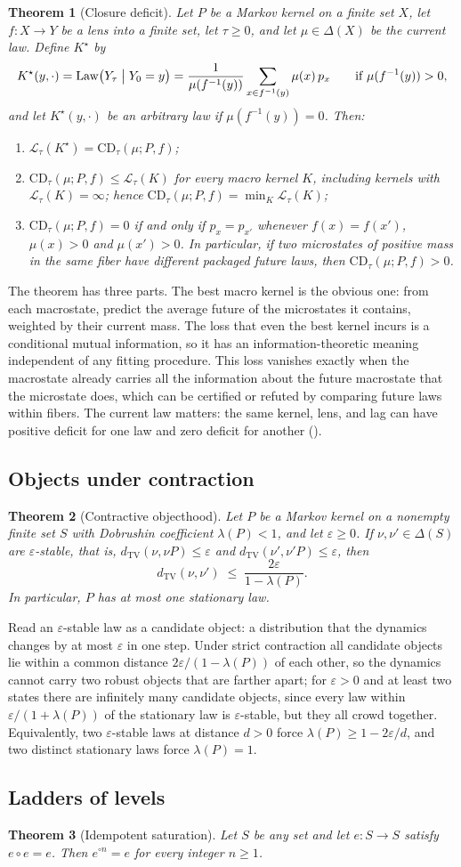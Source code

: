 \documentclass[11pt]{article}
\newtheorem{theorem}{Theorem}[section]
\theoremstyle{definition}
\newcommand{\1}{\mathbf{1}}
\newcommand{\dTV}{d_{\mathrm{TV}}}
\newcommand{\Law}{\mathrm{Law}}
\newcommand{\ThmStmtNGMACROCLOSUREDEFICIT}{Let $P$ be a Markov kernel on a finite set $X$, let $f:X\to Y$ be a lens into a finite set, let $\tau\ge 0$, and let $\mu\in\Delta(X)$ be the current law. Define $K^\star$ by
\[
  K^\star(y,\cdot)=\Law\bigl(Y_\tau\bigm| Y_0=y\bigr)=\frac{1}{\mu(f^{-1}(y))}\sum_{x\in f^{-1}(y)}\mu(x)\,p_x
  \qquad\text{if }\mu(f^{-1}(y))>0,
\]
and let $K^\star(y,\cdot)$ be an arbitrary law if $\mu(f^{-1}(y))=0$. Then:
\begin{enumerate}[label=(\roman*)]
  \item $\mathcal{L}_\tau(K^\star)=\mathrm{CD}_\tau(\mu;P,f)$;
  \item $\mathrm{CD}_\tau(\mu;P,f)\le\mathcal{L}_\tau(K)$ for every macro kernel $K$, including kernels with $\mathcal{L}_\tau(K)=\infty$; hence $\mathrm{CD}_\tau(\mu;P,f)=\min_K\mathcal{L}_\tau(K)$;
  \item $\mathrm{CD}_\tau(\mu;P,f)=0$ if and only if $p_x=p_{x'}$ whenever $f(x)=f(x')$, $\mu(x)>0$ and $\mu(x')>0$. In particular, if two microstates of positive mass in the same fiber have different packaged future laws, then $\mathrm{CD}_\tau(\mu;P,f)>0$.
\end{enumerate}
}
\newcommand{\ThmStmtNGOBJECTCONTRACTIVE}{Let $P$ be a Markov kernel on a nonempty finite set $S$ with Dobrushin coefficient $\lambda(P)<1$, and let $\varepsilon\ge 0$. If $\nu,\nu'\in\Delta(S)$ are $\varepsilon$-stable, that is, $\dTV(\nu,\nu P)\le\varepsilon$ and $\dTV(\nu',\nu'P)\le\varepsilon$, then
\[
  \dTV(\nu,\nu')\;\le\;\frac{2\varepsilon}{1-\lambda(P)}.
\]
In particular, $P$ has at most one stationary law.
}
\newcommand{\ThmStmtNGLADDERIDEM}{Let $S$ be any set and let $e:S\to S$ satisfy $e\circ e=e$. Then $e^{\circ n}=e$ for every integer $n\ge 1$.
}
\begin{document}
\begin{theorem}[Closure deficit]\label{thm:NG_MACRO_CLOSURE_DEFICIT}
\ThmStmtNGMACROCLOSUREDEFICIT
\end{theorem}

The theorem has three parts.
The best macro kernel is the obvious one: from each macrostate, predict the average future of the microstates it contains, weighted by their current mass.
The loss that even the best kernel incurs is a conditional mutual information, so it has an information-theoretic meaning independent of any fitting procedure.
This loss vanishes exactly when the macrostate already carries all the information about the future macrostate that the microstate does, which can be certified or refuted by comparing future laws within fibers.
The current law matters: the same kernel, lens, and lag can have positive deficit for one law and zero deficit for another ().

\subsection*{Objects under contraction}

\begin{theorem}[Contractive objecthood]\label{thm:NG_OBJECT_CONTRACTIVE}
\ThmStmtNGOBJECTCONTRACTIVE
\end{theorem}

Read an $\varepsilon$-stable law as a candidate object: a distribution that the dynamics changes by at most $\varepsilon$ in one step.
Under strict contraction all candidate objects lie within a common distance $2\varepsilon/(1-\lambda(P))$ of each other, so the dynamics cannot carry two robust objects that are farther apart; for $\varepsilon>0$ and at least two states there are infinitely many candidate objects, since every law within $\varepsilon/(1+\lambda(P))$ of the stationary law is $\varepsilon$-stable, but they all crowd together.
Equivalently, two $\varepsilon$-stable laws at distance $d>0$ force $\lambda(P)\ge 1-2\varepsilon/d$, and two distinct stationary laws force $\lambda(P)=1$.

\subsection*{Ladders of levels}

\begin{theorem}[Idempotent saturation]\label{thm:NG_LADDER_IDEM}
\ThmStmtNGLADDERIDEM
\end{theorem}
\end{document}
